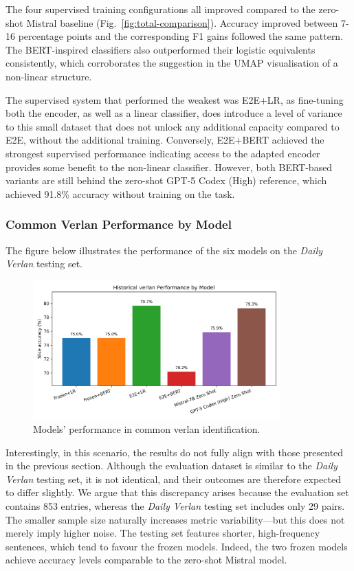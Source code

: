 \documentclass[12pt]{article}
\begin{document}
The four supervised training configurations all improved compared to the zero-shot Mistral baseline (Fig.~\ref{fig:total-comparison}). Accuracy improved between 7-16 percentage points and the corresponding F1 gains followed the same pattern. The BERT-inspired classifiers also outperformed their logistic equivalents consistently, which corroborates the suggestion in the UMAP visualisation of a non-linear structure.

The supervised system that performed the weakest was E2E+LR, as fine-tuning both the encoder, as well as a linear classifier, does introduce a level of variance to this small dataset that does not unlock any additional capacity compared to E2E, without the additional training. Conversely, E2E+BERT achieved the strongest supervised performance indicating access to the adapted encoder provides some benefit to the non-linear classifier. However, both BERT-based variants are still behind the zero-shot GPT-5 Codex (High) reference, which achieved 91.8\% accuracy without training on the task.

\subsubsection{Common Verlan Performance by Model}

The figure below illustrates the performance of the six models on the \textit{Daily Verlan} testing set.

\begin{figure}[htbp]
    \centering
    \includegraphics[width=0.85\textwidth]{figures/historical_verlan_comparison.png}
    \caption{Models' performance in common verlan identification.}
    \label{fig:historical-verlan-comparison}
\end{figure}

Interestingly, in this scenario, the results do not fully align with those presented in the previous section. 
Although the evaluation dataset is similar to the \textit{Daily Verlan} testing set, it is not identical, and their outcomes are therefore expected to differ slightly. 
We argue that this discrepancy arises because the evaluation set contains 853 entries, whereas the \textit{Daily Verlan} testing set includes only 29 pairs. 
The smaller sample size naturally increases metric variability\;---\;but this does not merely imply higher noise. 
The testing set features shorter, high-frequency sentences, which tend to favour the frozen models. 
Indeed, the two frozen models achieve accuracy levels comparable to the zero-shot Mistral model.
\end{document}
